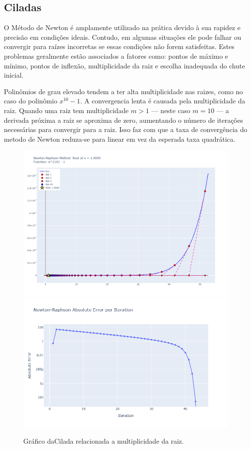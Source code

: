 \subsection{Ciladas}
O Método de Newton é amplamente utilizado na prática devido à sua rapidez e precisão em condições ideais. Contudo, em algumas situações ele pode falhar ou convergir para raízes incorretas se essas condições não forem satisfeitas. Estes problemas geralmente estão associados a fatores como: pontos de máximo e mínimo, pontos de inflexão, multiplicidade da raiz e escolha inadequada do chute inicial.

Polinômios de grau elevado tendem a ter alta multiplicidade nas raizes, como no caso do polinômio $x^{10} - 1$.
A convergencia lenta é causada pela multiplicidade da raiz. Quando uma raiz tem multiplicidade $m > 1$ — neste caso $m = 10$ — a derivada próxima a raiz se aproxima de zero, aumentando o número de iterações necessárias para convergir para a raiz.
Isso faz com que a taxa de convergência do metodo de Newton reduza-se para linear em vez da esperada taxa quadrática.
\begin{figure}[H]
    \centering 
    \includegraphics[width=1\textwidth]{Imagens/pitfalls/01/x_10-1.png}
    \includegraphics[width=1\textwidth]{Imagens/pitfalls/01/err_x_10-1.png}
    \caption{Gráfico daCilada relacionada a multiplicidade da raiz.}
    \label{fig:ciladaMultRaiz}
\end{figure}


